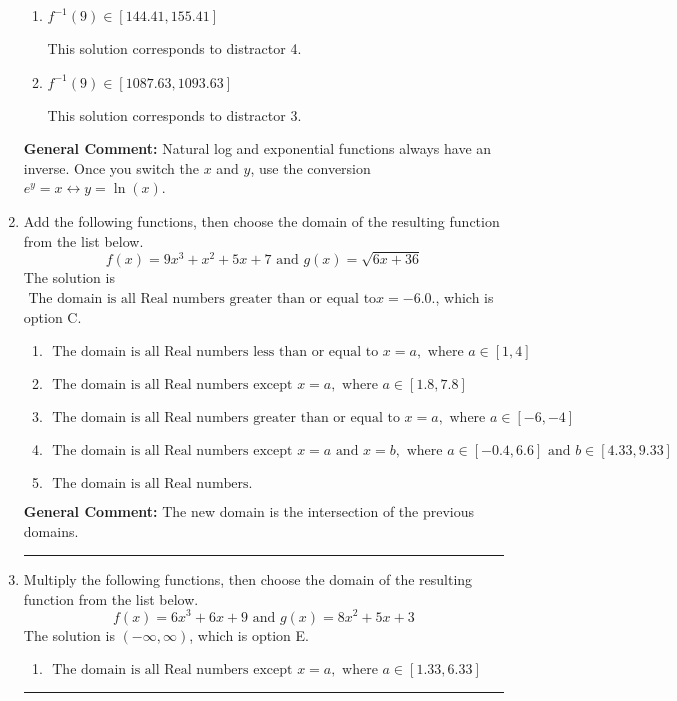 \documentclass{extbook}[14pt]
\newcommand{\litem}[1]{\item #1

\rule{\textwidth}{0.4pt}}
\begin{document}
\begin{enumerate}
{\begin{enumerate}[label=\Alph*.]
 This is the solution.
\item \( f^{-1}(9) \in [144.41, 155.41] \)

 This solution corresponds to distractor 4.
\item \( f^{-1}(9) \in [1087.63, 1093.63] \)

 This solution corresponds to distractor 3.
\end{enumerate}

\textbf{General Comment:} Natural log and exponential functions always have an inverse. Once you switch the $x$ and $y$, use the conversion $ e^y = x \leftrightarrow y=\ln(x)$.
}
\litem{
Add the following functions, then choose the domain of the resulting function from the list below.
\[ f(x) = 9x^{3} + x^{2} +5 x + 7 \text{ and } g(x) = \sqrt{6x+36}  \]The solution is \( \text{ The domain is all Real numbers greater than or equal to} x = -6.0. \), which is option C.\begin{enumerate}[label=\Alph*.]
\item \( \text{ The domain is all Real numbers less than or equal to } x = a, \text{ where } a \in [1, 4] \)


\item \( \text{ The domain is all Real numbers except } x = a, \text{ where } a \in [1.8, 7.8] \)


\item \( \text{ The domain is all Real numbers greater than or equal to } x = a, \text{ where } a \in [-6, -4] \)


\item \( \text{ The domain is all Real numbers except } x = a \text{ and } x = b, \text{ where } a \in [-0.4, 6.6] \text{ and } b \in [4.33, 9.33] \)


\item \( \text{ The domain is all Real numbers. } \)


\end{enumerate}

\textbf{General Comment:} The new domain is the intersection of the previous domains.
}
\litem{
Multiply the following functions, then choose the domain of the resulting function from the list below.
\[ f(x) = 6x^{3} +6 x + 9 \text{ and } g(x) = 8x^{2} +5 x + 3 \]The solution is \( (-\infty, \infty) \), which is option E.\begin{enumerate}[label=\Alph*.]
\item \( \text{ The domain is all Real numbers except } x = a, \text{ where } a \in [1.33, 6.33] \)



\end{enumerate}}
\end{enumerate}
\end{document}
